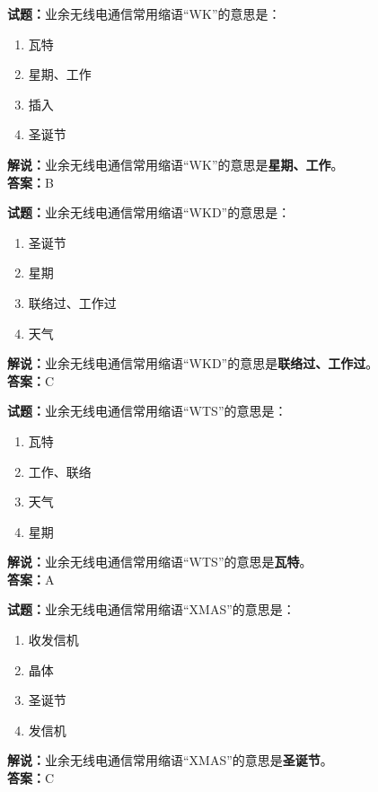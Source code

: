 \documentclass{ctexbook}
\begin{document}
\bigskip


\noindent\textbf{试题：}业余无线电通信常用缩语“WK”的意思是：
\begin{enumerate}[leftmargin=3em]
\item 瓦特
\item 星期、工作
\item 插入
\item 圣诞节
\end{enumerate}
\noindent\textbf{解说：}业余无线电通信常用缩语“WK”的意思是\textbf{星期、工作}。\\\noindent\textbf{答案：}B


\bigskip


\noindent\textbf{试题：}业余无线电通信常用缩语“WKD”的意思是：
\begin{enumerate}[leftmargin=3em]
\item 圣诞节
\item 星期
\item 联络过、工作过
\item 天气
\end{enumerate}
\noindent\textbf{解说：}业余无线电通信常用缩语“WKD”的意思是\textbf{联络过、工作过}。\\\noindent\textbf{答案：}C



\bigskip


\noindent\textbf{试题：}业余无线电通信常用缩语“WTS”的意思是：
\begin{enumerate}[leftmargin=3em]
\item 瓦特
\item 工作、联络
\item 天气
\item 星期
\end{enumerate}
\noindent\textbf{解说：}业余无线电通信常用缩语“WTS”的意思是\textbf{瓦特}。\\\noindent\textbf{答案：}A


\bigskip


\noindent\textbf{试题：}业余无线电通信常用缩语“XMAS”的意思是：
\begin{enumerate}[leftmargin=3em]
\item 收发信机
\item 晶体
\item 圣诞节
\item 发信机
\end{enumerate}
\noindent\textbf{解说：}业余无线电通信常用缩语“XMAS”的意思是\textbf{圣诞节}。\\\noindent\textbf{答案：}C
\end{document}
